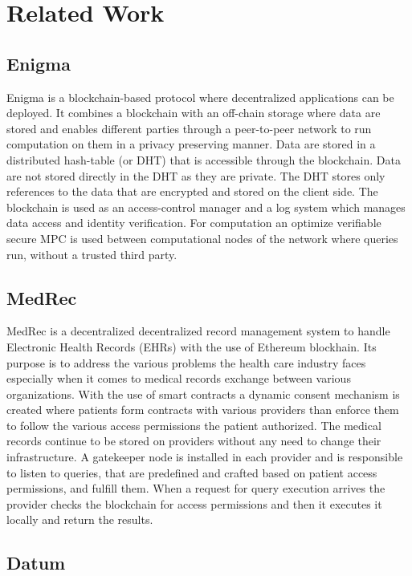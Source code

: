 \chapter{Related Work}
\label{related_work}

\section{Enigma}
\label{rel_work:enigma}

Enigma is a blockchain-based protocol where decentralized applications can be deployed. It combines a blockchain with an off-chain storage where data are stored and enables different parties through a peer-to-peer network to run computation on them in a privacy preserving manner. Data are stored in a distributed hash-table (or DHT) that is accessible through the blockchain. Data are not stored directly in the DHT as they are private. The DHT stores only references to the data that are encrypted and stored on the client side. The blockchain is used as an access-control manager and a log system which manages data access and identity verification. For computation an optimize verifiable secure MPC is used between computational nodes of the network where queries run, without a trusted third party.

\section{MedRec}
\label{rel_work:medrec}

MedRec is a decentralized decentralized record management system to handle Electronic Health Records (EHRs) with the use of Ethereum blockhain. Its purpose is to address the various problems the health care industry faces especially when it comes to medical records exchange between various organizations. With the use of smart contracts a dynamic consent mechanism is created where patients form contracts with various providers than enforce them to follow the various access permissions the patient authorized. The medical records continue to be stored on providers without any need to change their infrastructure. A gatekeeper node is installed in each provider and is responsible to listen to queries, that are predefined and crafted based on patient access permissions, and fulfill them. When a request for query execution arrives the provider checks the blockchain for access permissions and then it executes it locally and return the results.

\section{Datum}
\label{rel_work:datum}

